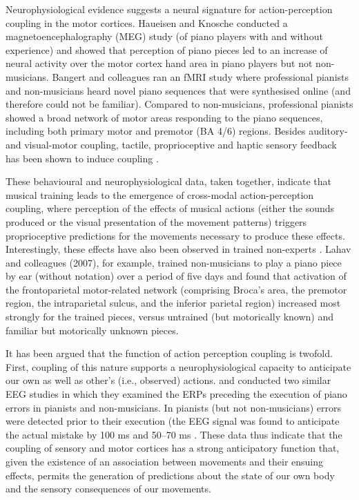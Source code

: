 Neurophysiological evidence suggests a neural signature for action-perception coupling in the motor cortices.  Haueisen and Knosche \citep{Haueisen2001} conducted a magnetoencephalography (MEG) study (of piano players with and without experience) and showed that perception of piano pieces led to an increase of neural activity over the motor cortex hand area in piano players but not non-musicians.  Bangert and colleagues \textcite{Bangert2006} ran an fMRI study where professional pianists and non-musicians heard novel piano sequences that were synthesised online (and therefore could not be familiar).  Compared to non-musicians, professional pianists showed a broad network of motor areas responding to the piano sequences, including both primary motor and premotor (BA 4/6) regions.  Besides auditory- and visual-motor coupling, tactile, proprioceptive and haptic sensory feedback has been shown to induce coupling \citep{Schulz2003,Kuchenbuch2014}.

These behavioural and neurophysiological data, taken together, indicate that musical training leads to the emergence of cross-modal action-perception coupling, where perception of the effects of musical actions (either the sounds produced or the visual presentation of the movement patterns) triggers proprioceptive predictions for the movements necessary to produce these effects. Interestingly, these effects have also been observed in trained non-experts \citep{Bangert2003,Lahav2007}.  Lahav and colleagues (2007), for example, trained non-musicians to play a piano piece by ear (without notation) over a period of five days and found that activation of the frontoparietal motor-related network (comprising Broca’s area, the premotor region, the intraparietal sulcus, and the inferior parietal region) increased most strongly for the trained pieces, versus untrained (but motorically known) and familiar but motorically unknown pieces.

It has been argued that the function of action perception coupling is twofold.  First, coupling of this nature supports a neurophysiological capacity to anticipate our own as well as other's  (i.e., observed) actions.  \textcite{Maidhof2009} and \textcite{Ruiz2009} conducted two similar EEG studies in which they examined the ERPs preceding the execution of piano errors in pianists and non-musicians.  In pianists (but not non-musicians) errors were detected prior to their execution (the EEG signal was found to anticipate the actual mistake by 100 ms \citep{Maidhof2009} and 50–70 ms \citep{Ruiz009}.  These data thus indicate that the coupling of sensory and motor cortices has a strong anticipatory function that, given the existence of an association between movements and their ensuing effects, permits the generation of predictions about the state of our own body and the sensory consequences of our movements.

